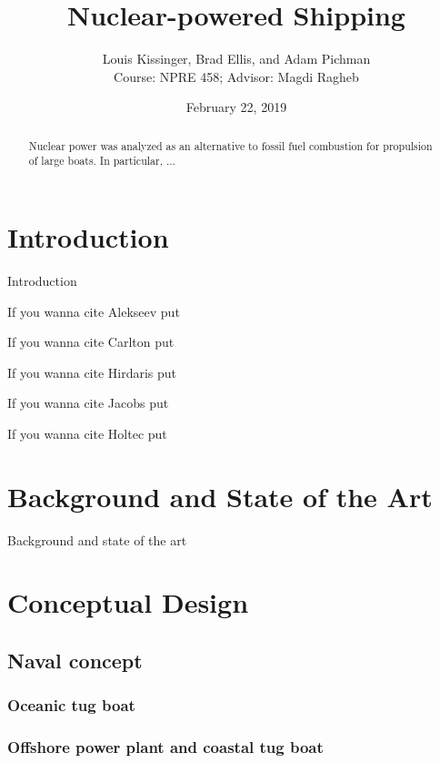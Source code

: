 \documentclass[12pt]{article}
\title{Nuclear-powered Shipping}
\author{Louis Kissinger, Brad Ellis, and Adam Pichman \\Course: NPRE 458; Advisor: Magdi Ragheb}
\date{February 22, 2019}
\begin{document}
\maketitle
%
\pagebreak
\begin{abstract}
Nuclear power was analyzed as an alternative to fossil fuel combustion for propulsion of large boats. In particular, ... 
\end{abstract} 

\pagebreak
\tableofcontents


\section{Introduction}
Introduction

If you wanna cite Alekseev put \cite{alekseev}

If you wanna cite Carlton put \cite{Carlton}

\cite{Gravina}

\cite{Han}

\cite{iaea}

If you wanna cite Hirdaris put \cite{Hirdaris}

If you wanna cite Jacobs put \cite{Jacobs}

If you wanna cite Holtec put \cite{Holtec}



\section{Background and State of the Art}
Background and state of the art
\section{Conceptual Design}
\subsection{Naval concept}
\subsubsection{Oceanic tug boat}
\subsubsection{Offshore power plant and coastal tug boat}
\end{document}
